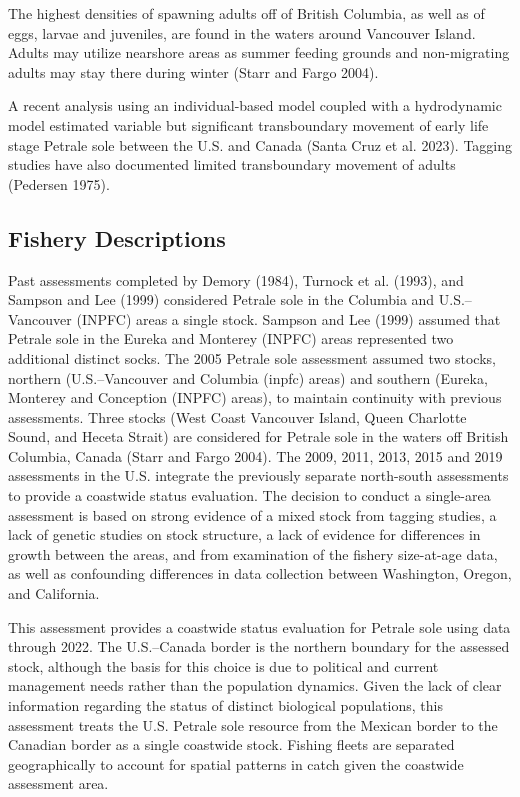 \documentclass[
]{scrartcl}
\begin{document}
The highest densities of spawning adults off of British Columbia, as
well as of eggs, larvae and juveniles, are found in the waters around
Vancouver Island. Adults may utilize nearshore areas as summer feeding
grounds and non-migrating adults may stay there during winter (Starr and
Fargo 2004).

A recent analysis using an individual-based model coupled with a
hydrodynamic model estimated variable but significant transboundary
movement of early life stage Petrale sole between the U.S. and Canada
(Santa Cruz et al. 2023). Tagging studies have also documented limited
transboundary movement of adults (Pedersen 1975).

\subsection{Fishery Descriptions}\label{fishery-descriptions}

Past assessments completed by Demory (1984), Turnock et al. (1993), and
Sampson and Lee (1999) considered Petrale sole in the Columbia and
U.S.--Vancouver (INPFC) areas a single stock. Sampson and Lee (1999)
assumed that Petrale sole in the Eureka and Monterey (INPFC) areas
represented two additional distinct socks. The 2005 Petrale sole
assessment assumed two stocks, northern (U.S.--Vancouver and Columbia
(\textsf{inpfc}) areas) and southern (Eureka, Monterey and Conception (INPFC)
areas), to maintain continuity with previous assessments. Three stocks
(West Coast Vancouver Island, Queen Charlotte Sound, and Heceta Strait)
are considered for Petrale sole in the waters off British Columbia,
Canada (Starr and Fargo 2004). The 2009, 2011, 2013, 2015 and 2019
assessments in the U.S. integrate the previously separate north-south
assessments to provide a coastwide status evaluation. The decision to
conduct a single-area assessment is based on strong evidence of a mixed
stock from tagging studies, a lack of genetic studies on stock
structure, a lack of evidence for differences in growth between the
areas, and from examination of the fishery size-at-age data, as well as
confounding differences in data collection between Washington, Oregon,
and California.

This assessment provides a coastwide status evaluation for Petrale sole
using data through 2022. The U.S.--Canada border is the northern
boundary for the assessed stock, although the basis for this choice is
due to political and current management needs rather than the population
dynamics. Given the lack of clear information regarding the status of
distinct biological populations, this assessment treats the U.S. Petrale
sole resource from the Mexican border to the Canadian border as a single
coastwide stock. Fishing fleets are separated geographically to account
for spatial patterns in catch given the coastwide assessment area.
\end{document}
